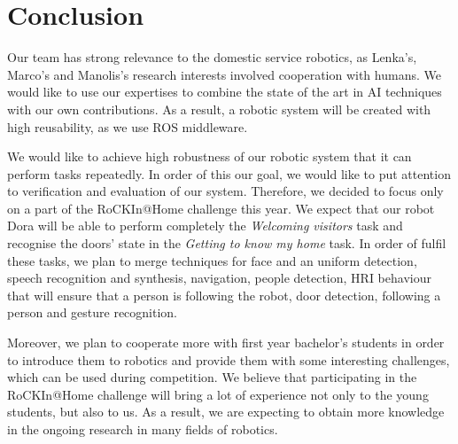 \documentclass[conference]{IEEEtran}
\begin{document}

\section{Conclusion}
Our team has strong relevance to the domestic service robotics, as
Lenka's, Marco's and Manolis's research interests involved cooperation with
humans. We would like to use our expertises to combine the state of the art
in AI techniques with our own contributions. As a result, a robotic system
will be created with high reusability, as we use ROS middleware.

We would like to achieve high robustness of our robotic system that it can perform tasks repeatedly. In order of this our goal, we would like to put attention to verification and evaluation of our system. Therefore, we decided to focus only on a part of the RoCKIn@Home challenge this year. We expect that our robot Dora will be able to perform completely
the \textit{Welcoming visitors} task and recognise the doors' state in the
\textit{Getting to know my home} task. In order of fulfil these tasks, we
plan to merge techniques for face and an uniform detection, speech
recognition and synthesis, navigation, people detection, HRI behaviour that
will ensure that a person is following the robot, door detection, following
a person and gesture recognition.

Moreover, we plan to cooperate more with first year bachelor's students in
order to introduce them to robotics and provide them with some interesting
challenges, which can be used during competition. We believe that
participating in the RoCKIn@Home challenge will bring a lot of experience
not only to the young students, but also to us. As a result, we are
expecting to obtain more knowledge in the ongoing research in many fields
of robotics.

\end{document}
